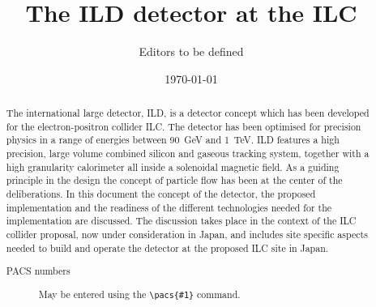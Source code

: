 \documentclass[%
 amsmath,amssymb,
 aps,
]{revtex4-1}
\begin{document}


\title{The ILD detector at the ILC}%

\author{Editors to be defined}




\date{\today}%

\begin{abstract}
The international large detector, ILD, is a detector concept which has been developed for the electron-positron collider ILC. The detector has been optimised for precision physics in a range of energies between 90~GeV and 1~TeV. ILD features a high precision, large volume combined silicon and gaseous tracking system, together with a high granularity calorimeter all inside a solenoidal magnetic field. As a guiding principle in the design the concept of particle flow has been at the center of the deliberations. In this document the concept of the detector, the proposed implementation and the readiness of the different technologies needed for the implementation are discussed. The discussion takes place in the context of the ILC collider proposal, now under consideration in Japan, and includes site specific aspects needed to build and operate the detector at the proposed ILC site in Japan.

\begin{description}
\item[PACS numbers]
May be entered using the \verb+\pacs{#1}+ command.
\end{description}
\end{abstract}
\end{document}
